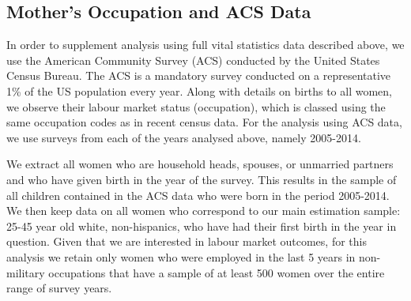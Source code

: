 \documentclass[a4paper, 12 pt]{article}
\theoremstyle{plain}
\begin{document}
\begin{doublespace}


\subsection{Mother's Occupation and ACS Data}
In order to supplement analysis using full vital statistics data described above,
we use the American Community Survey (ACS) conducted by the United States Census
Bureau.  The ACS is a mandatory survey conducted on a representative 1\% of the
US population every year.  Along with details on births to all women, we observe
their labour market status (occupation), which is classed using the same
occupation codes as in recent census data.  For the analysis using ACS data, we
use surveys from each of the years analysed above, namely 2005-2014.

We extract all women who are household heads, spouses, or unmarried partners and
who have given birth in the year of the survey.  This results in the sample of
all children contained in the ACS data who were born in the period 2005-2014. We
then keep data on all women who correspond to our main estimation sample: 25-45
year old white, non-hispanics, who have had their first birth in the year in
question.  Given that we are interested in labour market outcomes, for this
analysis we retain only women who were employed in the last 5 years in non-%
military occupations that have a sample of at least 500 women over the entire
range of survey years.


\end{doublespace}
\end{document}
